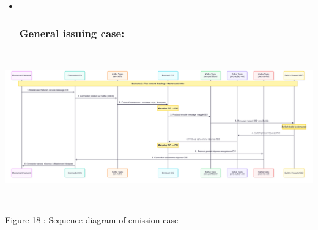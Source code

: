 \documentclass[12pt,a4paper]{report}
\begin{document}
\begin{itemize}
\item ~
  \hypertarget{general-issuing-case}{%
  \subsubsection{\texorpdfstring{\textbf{General issuing
  case:}}{General issuing case:}}\label{general-issuing-case}}
\end{itemize}

\includegraphics[width=7.10423in,height=2.60249in]{vertopal_d1b0b2209edd4c6aa8254f57daa0953b/media/image37.png}

\protect\hypertarget{_Toc201954494}{}{}Figure 18 : Sequence diagram of
emission case
\end{document}
